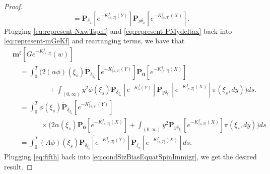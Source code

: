 \documentclass[UTF8]{pkuthss}
\theoremstyle{plain}
\theoremstyle{definition}
\numberwithin{equation}{section}
\begin{document}
\begin{proof}
\begin{equation}
	=\dot{\mathbf P}_{\delta_x}[e^{-K^f_{(s,T]}(Y)}]\mathbf P_{y\delta_x}
	[e^{-K^f_{(s,T]}(X)}].
\end{equation}
	Plugging \eqref{eq:represent-NxwTsphi} and \eqref{eq:represent-PMydeltax} back into \eqref{eq:represent-mGeKf} and rearranging terms, we have that
\begin{equation}\label{eq:fifth}
\begin{split}
    &\mathbf m^\xi[Ge^{-K_{(s, T]}^f}(w)]\\
	&\quad=\int_0^T \Big(2(\alpha\phi)(\xi_s)\dot{\mathbf P}_{\delta_{\xi_s}}[e^{-K^f_{(s,T]}(Y)}]\mathbf P_{\mathbf 0}[e^{-K^f_{(s,T]}(X)}] \\
	&\qquad\qquad\quad + \int_{(0,\infty)}y^2\phi(\xi_s)\dot{\mathbf P}_{\delta_{\xi_s}}[e^{-K_s^f(Y)}]\mathbf P_{y\delta_{\xi_s}}[e^{-K^f_{(s,T]}(X)}]\pi(\xi_s,dy)\Big)ds.\\
	&\quad=\int_0^T \phi(\xi_s)\dot{\mathbf P}_{\delta_{\xi_s}}[e^{-K^f_{(s,T]}(Y)}] \\
	&\qquad\qquad\times\Big(2\alpha(\xi_s)\mathbf P_{\mathbf 0}[e^{-K^f_{(s,T]}(X)}] + \int_{(0,\infty)}y^2\mathbf P_{y\delta_{\xi_s}}[e^{-K^f_{(s,T]}(X)}]\pi(\xi_s,dy)\Big)ds\\
	&\quad =\int_0^T (A\phi)(\xi_s)\dot{\mathbf P}_{\delta_{\xi_s}}[e^{-K^f_{(s,T]}(Y)}]\widetilde {\mathbf P}_{\xi_s}[e^{-K^f_{(s,T]}(X)}]ds.
\end{split}\end{equation}
	Plugging \eqref{eq:fifth} back into \eqref{eq:condSizBiasEquatSpinImmigr}, we get the desired result.
\end{proof}
\end{document}
